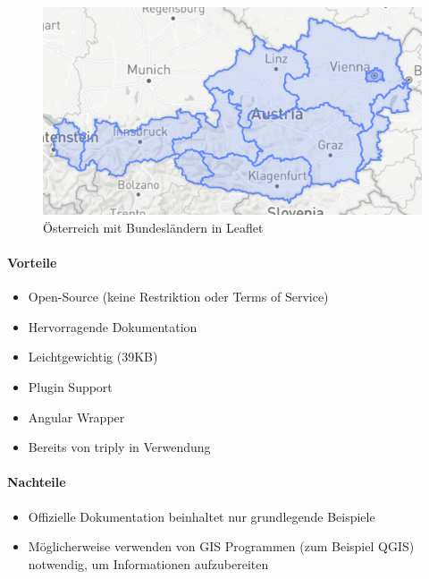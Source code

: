 \begin{figure}[hbt!]
    \centering
    \includegraphics[scale=0.4]{pics/austria-leaflet}
    \caption{Österreich mit Bundesländern in Leaflet}
    \label{fig:austria-leaflet}
\end{figure}

\paragraph{Vorteile}
\begin{itemize}
    \item Open-Source (keine Restriktion oder Terms of Service)
    \item Hervorragende Dokumentation
    \item Leichtgewichtig (39KB)
    \item Plugin Support
    \item Angular Wrapper
    \item Bereits von triply in Verwendung
\end{itemize}

\paragraph{Nachteile}
\begin{itemize}
    \item Offizielle Dokumentation beinhaltet nur grundlegende Beispiele
    \item Möglicherweise verwenden von GIS Programmen (zum Beispiel QGIS) notwendig, um Informationen aufzubereiten
\end{itemize}

